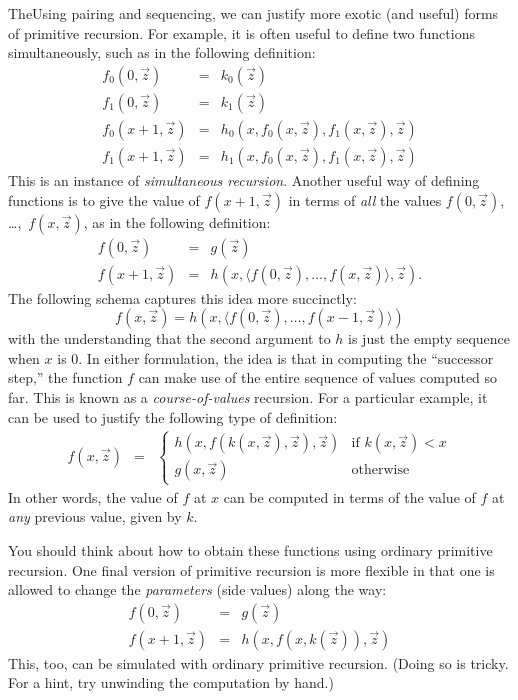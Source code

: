 \documentclass[../../include/open-logic-section]{subfiles}
\begin{document}

TheUsing pairing and sequencing, we can justify more exotic (and
useful) forms of primitive recursion. For example, it is often useful
to define two functions simultaneously, such as in the following
definition:
\begin{eqnarray*}
f_0(0,\vec z) & = & k_0(\vec z) \\
f_1(0,\vec z) & = & k_1(\vec z) \\
f_0(x+1,\vec z) & = & h_0(x,f_0(x,\vec z),f_1(x,\vec z),\vec z) \\
f_1(x+1,\vec z) & = & h_1(x,f_0(x,\vec z),f_1(x,\vec z),\vec z)
\end{eqnarray*}
This is an instance of \emph{simultaneous recursion}. Another useful
way of defining functions is to give the value of $f(x+1,\vec z)$ in
terms of \emph{all} the values $f(0,\vec z)$, \dots,~$f(x,\vec z)$, as in
the following definition:
\begin{eqnarray*}
f(0,\vec z) & = & g(\vec z) \\
f(x+1,\vec z) & = & h(x, \langle f(0,\vec z), \dots, f(x,\vec z) \rangle,
\vec z).
\end{eqnarray*}
The following schema captures this idea more succinctly:
\[
f(x,\vec z) = h(x,\langle f(0,\vec z), \dots, f(x-1,\vec z) \rangle)
\]
with the understanding that the second argument to $h$ is just the
empty sequence when $x$ is $0$. In either formulation, the idea is
that in computing the ``successor step,'' the function $f$ can make
use of the entire sequence of values computed so far.
This is known as a \emph{course-of-values} recursion. For a particular
example, it can be used to justify the following type of definition:
\begin{eqnarray*}
f(x,\vec z) & = & \left\{
\begin{array}{ll}
  h(x,f(k(x,\vec z),\vec z),\vec z) & \text{if $k(x,\vec z) < x$} \\
  g(x,\vec z) & \text{otherwise}
\end{array}\right.
\end{eqnarray*}
In other words, the value of $f$ at $x$ can be computed in terms of
the value of $f$ at \emph{any} previous value, given by $k$.

You should think about how to obtain these functions using ordinary
primitive recursion. One final version of primitive recursion is more
flexible in that one is allowed to change the \emph{parameters} (side
values) along the way:
\begin{eqnarray*}
f(0,\vec z) & = & g(\vec z) \\
f(x+1,\vec z) & = & h(x,f(x,k(\vec z)),\vec z)
\end{eqnarray*}
This, too, can be simulated with ordinary primitive recursion. (Doing
so is tricky. For a hint, try unwinding the computation by hand.)
\end{document}
